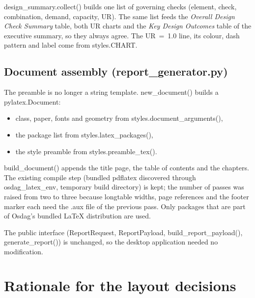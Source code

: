 \documentclass[10pt,a4paper]{article}
\newcommand{\file}[1]{{\footnotesize\ttfamily #1}}
\newcommand{\code}[1]{{\small\ttfamily #1}}
\begin{document}
\code{design\_summary.collect()} builds one list of governing checks (element, check, combination, demand, capacity, UR). The same list feeds the \emph{Overall Design Check Summary} table, both UR charts and the \emph{Key Design Outcomes} table of the executive summary, so they always agree. The UR~=~1.0 line, its colour, dash pattern and label come from \code{styles.CHART}.

\subsection{Document assembly (\file{report\_generator.py})}

The preamble is no longer a string template. \code{new\_document()} builds a \code{pylatex.Document}:
\begin{itemize}
\item class, paper, fonts and geometry from \code{styles.document\_arguments()},
\item the package list from \code{styles.latex\_packages()},
\item the style preamble from \code{styles.preamble\_tex()}.
\end{itemize} \code{build\_document()} appends the title page, the table of contents and the chapters. The existing compile step (bundled pdflatex discovered through \code{osdag\_latex\_env}, temporary build directory) is kept; the number of passes was raised from two to three because longtable widths, page references and the footer marker each need the \code{.aux} file of the previous pass. Only packages that are part of Osdag's bundled LaTeX distribution are used.

The public interface (\code{ReportRequest}, \code{ReportPayload}, \code{build\_report\_payload()}, \code{generate\_report()}) is unchanged, so the desktop application needed no modification.

\section{Rationale for the layout decisions}
\end{document}
